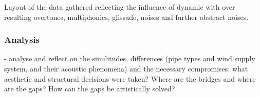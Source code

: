 Layout of the data gathered reflecting the influence of dynamic with over resulting overtones, multiphonics, glissade, noises and further  abstract noises. 

\subsubsection{Analysis}

- analyse and reflect on the similitudes, differences (pipe types and wind supply system, and their acoustic phenomena) and the necessary compromises: what aesthetic and structural decisions were taken? Where are the bridges and where are the gaps? How can the gaps be artistically solved?\\
\\



